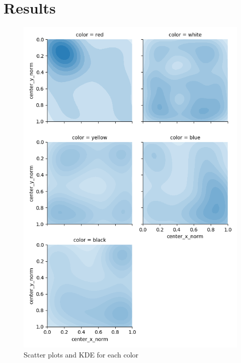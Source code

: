 \section{Results}





\begin{figure}
  \includegraphics[width=\linewidth]{images/kernel-densities.png}
  \caption{Scatter plots and KDE for each color}
  \label{fig:kde}
\end{figure}

